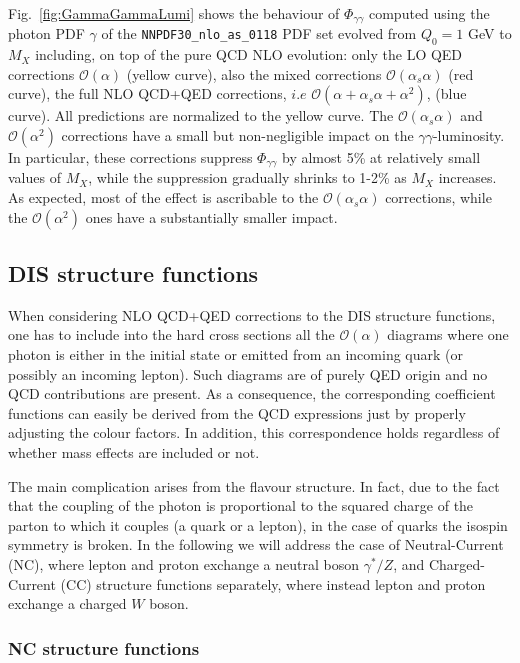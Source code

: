 Fig.~\ref{fig:GammaGammaLumi} shows the behaviour of
$\Phi_{\gamma\gamma}$ computed using the photon PDF $\gamma$ of the
{\tt NNPDF30\_nlo\_as\_0118} PDF set evolved from $Q_0 = 1$ GeV to
$M_X$ including, on top of the pure QCD NLO evolution: only the LO QED
corrections $\mathcal{O}(\alpha)$ (yellow curve), also the mixed
corrections $\mathcal{O}(\alpha_s\alpha)$ (red curve), the full NLO
QCD+QED corrections, $i.e$
$\mathcal{O}(\alpha+\alpha_s\alpha+\alpha^2)$, (blue curve). All
predictions are normalized to the yellow curve. The
$\mathcal{O}(\alpha_s\alpha)$ and $\mathcal{O}(\alpha^2)$ corrections
have a small but non-negligible impact on the
$\gamma\gamma$-luminosity. In particular, these corrections suppress
$\Phi_{\gamma\gamma}$ by almost 5\% at relatively small values of
$M_X$, while the suppression gradually shrinks to 1-2\% as $M_X$
increases. As expected, most of the effect is ascribable to the
$\mathcal{O}(\alpha_s\alpha)$ corrections, while the
$\mathcal{O}(\alpha^2)$ ones have a substantially smaller impact.

\subsection{DIS structure functions}

When considering NLO QCD+QED corrections to the DIS structure
functions, one has to include into the hard cross sections all the
$\mathcal{O}(\alpha)$ diagrams where one photon is either in the
initial state or emitted from an incoming quark (or possibly an
incoming lepton). Such diagrams are of purely QED origin and no QCD
contributions are present. As a consequence, the corresponding
coefficient functions can easily be derived from the QCD expressions
just by properly adjusting the colour factors. In addition, this
correspondence holds regardless of whether mass effects are included
or not.

The main complication arises from the flavour structure. In fact, due
to the fact that the coupling of the photon is proportional to the
squared charge of the parton to which it couples (a quark or a
lepton), in the case of quarks the isospin symmetry is broken. In the
following we will address the case of Neutral-Current (NC), where
lepton and proton exchange a neutral boson $\gamma^*/Z$, and
Charged-Current (CC) structure functions separately, where instead
lepton and proton exchange a charged $W$ boson.

\subsubsection{NC structure functions}

